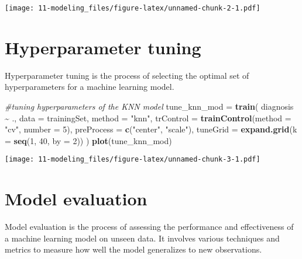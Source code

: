 \documentclass[
]{book}
\newenvironment{Shaded}{\begin{snugshade}}{\end{snugshade}}
\newcommand{\AttributeTok}[1]{\textcolor[rgb]{0.13,0.29,0.53}{#1}}
\newcommand{\CommentTok}[1]{\textcolor[rgb]{0.56,0.35,0.01}{\textit{#1}}}
\newcommand{\DecValTok}[1]{\textcolor[rgb]{0.00,0.00,0.81}{#1}}
\newcommand{\FunctionTok}[1]{\textcolor[rgb]{0.13,0.29,0.53}{\textbf{#1}}}
\newcommand{\NormalTok}[1]{#1}
\newcommand{\OtherTok}[1]{\textcolor[rgb]{0.56,0.35,0.01}{#1}}
\newcommand{\SpecialCharTok}[1]{\textcolor[rgb]{0.81,0.36,0.00}{\textbf{#1}}}
\newcommand{\StringTok}[1]{\textcolor[rgb]{0.31,0.60,0.02}{#1}}
\begin{document}
\texttt{[image: 11-modeling\_files/figure-latex/unnamed-chunk-2-1.pdf]}

\hypertarget{hyperparameter-tuning}{%
\section{Hyperparameter tuning}\label{hyperparameter-tuning}}

Hyperparameter tuning is the process of selecting the optimal set of hyperparameters for a machine learning model.

\begin{Shaded}
\begin{Highlighting}[]
\CommentTok{\#tuning hyperparameters of the KNN model}
\NormalTok{tune\_knn\_mod }\OtherTok{=} \FunctionTok{train}\NormalTok{(}
\NormalTok{  diagnosis }\SpecialCharTok{\textasciitilde{}}\NormalTok{ .,}
  \AttributeTok{data =}\NormalTok{ trainingSet,}
  \AttributeTok{method =} \StringTok{"knn"}\NormalTok{,}
  \AttributeTok{trControl =} \FunctionTok{trainControl}\NormalTok{(}\AttributeTok{method =} \StringTok{"cv"}\NormalTok{, }\AttributeTok{number =} \DecValTok{5}\NormalTok{),}
  \AttributeTok{preProcess =} \FunctionTok{c}\NormalTok{(}\StringTok{"center"}\NormalTok{, }\StringTok{"scale"}\NormalTok{),}
  \AttributeTok{tuneGrid =} \FunctionTok{expand.grid}\NormalTok{(}\AttributeTok{k =} \FunctionTok{seq}\NormalTok{(}\DecValTok{1}\NormalTok{, }\DecValTok{40}\NormalTok{, }\AttributeTok{by =} \DecValTok{2}\NormalTok{))}
\NormalTok{)}
\FunctionTok{plot}\NormalTok{(tune\_knn\_mod)}
\end{Highlighting}
\end{Shaded}

\texttt{[image: 11-modeling\_files/figure-latex/unnamed-chunk-3-1.pdf]}

\hypertarget{model-evaluation}{%
\section{\texorpdfstring{Model evaluation\\
}{Model evaluation }}\label{model-evaluation}}

Model evaluation is the process of assessing the performance and effectiveness of a machine learning model on unseen data. It involves various techniques and metrics to measure how well the model generalizes to new observations.
\end{document}
